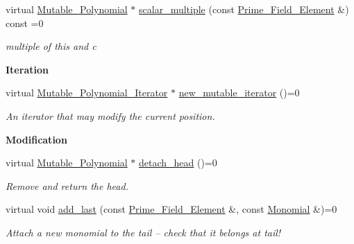 \begin{Indent}
\begin{DoxyCompactItemize}
\mbox{\label{class_mutable___polynomial_a48d28e7a5fc543e18511f2dd24739ad7}} 
virtual \hyperlink{class_mutable___polynomial}{Mutable\+\_\+\+Polynomial} $\ast$ \hyperlink{class_mutable___polynomial_a48d28e7a5fc543e18511f2dd24739ad7}{scalar\+\_\+multiple} (const \hyperlink{class_prime___field___element}{Prime\+\_\+\+Field\+\_\+\+Element} \&) const =0
\begin{DoxyCompactList}\small\item\em multiple of this and c \end{DoxyCompactList}\end{DoxyCompactItemize}
\end{Indent}
\begin{Indent}\textbf{ Iteration}\par
\begin{DoxyCompactItemize}
\item 
\mbox{\label{class_mutable___polynomial_a803892196221e618214c80987cec191a}} 
virtual \hyperlink{class_mutable___polynomial___iterator}{Mutable\+\_\+\+Polynomial\+\_\+\+Iterator} $\ast$ \hyperlink{class_mutable___polynomial_a803892196221e618214c80987cec191a}{new\+\_\+mutable\+\_\+iterator} ()=0
\begin{DoxyCompactList}\small\item\em An iterator that may modify the current position. \end{DoxyCompactList}\end{DoxyCompactItemize}
\end{Indent}
\begin{Indent}\textbf{ Modification}\par
\begin{DoxyCompactItemize}
\item 
\mbox{\label{class_mutable___polynomial_a3acd7e39f907f95ab05a9ee68af7556c}} 
virtual \hyperlink{class_mutable___polynomial}{Mutable\+\_\+\+Polynomial} $\ast$ \hyperlink{class_mutable___polynomial_a3acd7e39f907f95ab05a9ee68af7556c}{detach\+\_\+head} ()=0
\begin{DoxyCompactList}\small\item\em Remove and return the head. \end{DoxyCompactList}\item 
\mbox{\label{class_mutable___polynomial_a966bd6c897acf04ac697bc0a4ca46a89}} 
virtual void \hyperlink{class_mutable___polynomial_a966bd6c897acf04ac697bc0a4ca46a89}{add\+\_\+last} (const \hyperlink{class_prime___field___element}{Prime\+\_\+\+Field\+\_\+\+Element} \&, const \hyperlink{class_monomial}{Monomial} \&)=0
\begin{DoxyCompactList}\small\item\em Attach a new monomial to the tail -- check that it belongs at tail! \end{DoxyCompactList}\end{DoxyCompactItemize}
\end{Indent}
